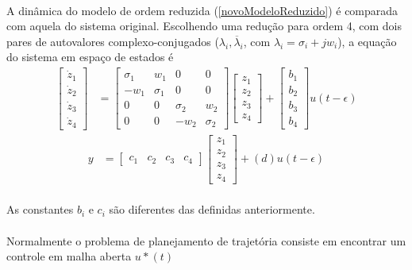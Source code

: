 \documentclass[a4paper,11pt]{scrartcl} %
\numberwithin{equation}{section} %
\numberwithin{figure}{section} %
\numberwithin{table}{section} %
\begin{document}
\paragraph{} A dinâmica do modelo de ordem reduzida (\ref{novoModeloReduzido}) é comparada com aquela do sistema original. Escolhendo uma redução para ordem 4, com dois pares de autovalores complexo-conjugados ($\lambda_i,\overline{\lambda}_i$, com $\lambda_i = \sigma_i + j w_i$), a equação do sistema em espaço de estados é \begin{align}
	\left[\begin{array}{c}
	\dot{z}_1\\ \dot{z}_2\\ \dot{z}_3\\ \dot{z}_4
	\end{array}\right] &= \left[\begin{array}{cccc}
	\sigma_1 & w_1 & 0 & 0\\ -w_1 & \sigma_1 & 0 & 0\\
	0 & 0 & \sigma_2 & w_2\\ 0 & 0 & -w_2 & \sigma_2
\end{array}\right] \left[\begin{array}{c}z_1\\ z_2\\ z_3\\ z_4\end{array}\right] + \left[\begin{array}{c}b_1\\ b_2\\ b_3\\ b_4\end{array}\right]u(t-\epsilon)
\end{align} \begin{align}
	y &= \left[\begin{array}{cccc}
	c_1 & c_2 & c_3 & c_4
\end{array}\right] \left[\begin{array}{c}
	z_1\\ z_2\\ z_3\\ z_4
\end{array}\right] + (d) u(t-\epsilon)
\end{align}

\paragraph{} As constantes $b_i$ e $c_i$ são diferentes das definidas anteriormente. %

\paragraph{} Normalmente o problema de planejamento de trajetória consiste em encontrar um controle em malha aberta $u*(t)$
\end{document}
